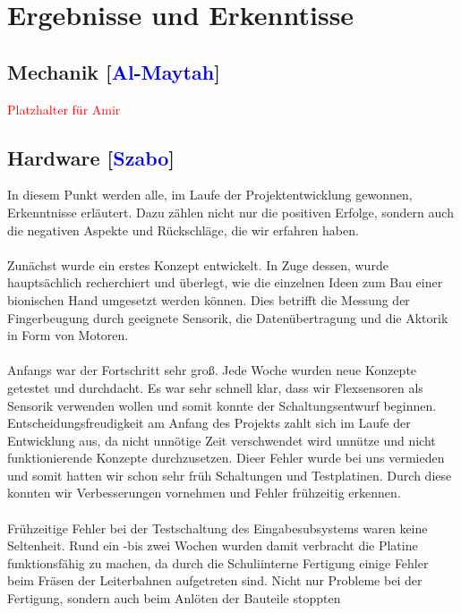 \documentclass[titlepage,12pt,twoside]{article}
\begin{document}
\newpage
\section{Ergebnisse und Erkenntisse}
\label{chap:Ergebnisse und Erkenntisse}
\subsection{Mechanik [\textcolor{blue}{Al-Maytah}]}
\textcolor{red}{Platzhalter für Amir}
\\
\subsection{Hardware [\textcolor{blue}{Szabo}]}
In diesem Punkt werden alle, im Laufe der Projektentwicklung gewonnen, Erkenntnisse erläutert. Dazu zählen nicht nur die
positiven Erfolge, sondern auch die negativen Aspekte und Rückschläge, die wir erfahren haben. \\
\\
Zunächst wurde ein erstes Konzept entwickelt. In Zuge dessen, wurde hauptsächlich recherchiert und überlegt, wie die 
einzelnen Ideen zum Bau einer bionischen Hand umgesetzt werden können. Dies betrifft die Messung der Fingerbeugung durch geeignete Sensorik, 
die Datenübertragung und die Aktorik in Form von Motoren. \\
\\
Anfangs war der Fortschritt sehr groß. Jede Woche wurden neue Konzepte getestet und durchdacht. Es war sehr schnell klar, dass wir Flexsensoren
als Sensorik verwenden wollen und somit konnte der Schaltungsentwurf beginnen. Entscheidungsfreudigkeit am Anfang des Projekts zahlt sich im Laufe der Entwicklung aus,
da nicht unnötige Zeit verschwendet wird unnütze und nicht funktionierende Konzepte durchzusetzen. Dieer Fehler wurde bei uns vermieden und somit hatten wir schon sehr früh 
Schaltungen und Testplatinen. Durch diese konnten wir Verbesserungen vornehmen und Fehler frühzeitig erkennen. \\
\\
Frühzeitige Fehler bei der Testschaltung des Eingabesubsystems waren keine Seltenheit. Rund ein -bis zwei Wochen wurden damit verbracht die Platine funktionsfähig zu machen, da 
durch die Schuliinterne Fertigung einige Fehler beim Fräsen der Leiterbahnen aufgetreten sind. Nicht nur Probleme bei der Fertigung, sondern auch beim Anlöten der Bauteile stoppten 
\end{document}
